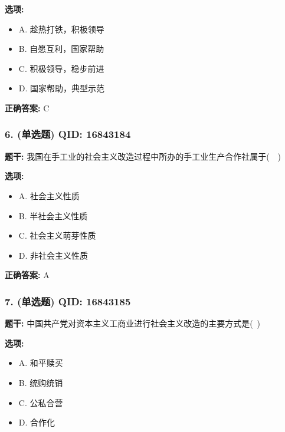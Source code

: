 \documentclass[12pt,UTF8]{ctexart}
\begin{document}
\textbf{选项:}
\begin{itemize}[leftmargin=*]

  \item A. 趁热打铁，积极领导

  \item B. 自愿互利，国家帮助

  \item C. 积极领导，稳步前进

  \item D. 国家帮助，典型示范

\end{itemize}

\textbf{正确答案:}
C

\vspace{0.3em}\hrulefill\vspace{0.7em}

\subsubsection*{6. (单选题) \small QID: 16843184}

\textbf{题干:}
我国在手工业的社会主义改造过程中所办的手工业生产合作社属于(  )

\textbf{选项:}
\begin{itemize}[leftmargin=*]

  \item A. 社会主义性质

  \item B. 半社会主义性质

  \item C. 社会主义萌芽性质

  \item D. 非社会主义性质

\end{itemize}

\textbf{正确答案:}
A

\vspace{0.3em}\hrulefill\vspace{0.7em}

\subsubsection*{7. (单选题) \small QID: 16843185}

\textbf{题干:}
中国共产党对资本主义工商业进行社会主义改造的主要方式是( )

\textbf{选项:}
\begin{itemize}[leftmargin=*]

  \item A. 和平赎买

  \item B. 统购统销

  \item C. 公私合营

  \item D. 合作化

\end{itemize}
\end{document}
